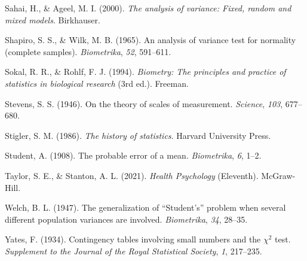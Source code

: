 \documentclass[
  11pt,
  a4paper,
  twoside,symmetric,openright]{book}
\theoremstyle{break}
\theoremstyle{break}
\begin{document}
\begin{CSLReferences}
Sahai, H., \& Ageel, M. I. (2000). \emph{The analysis of variance: Fixed, random and mixed models}. Birkhauser.

Shapiro, S. S., \& Wilk, M. B. (1965). An analysis of variance test for normality (complete samples). \emph{Biometrika}, \emph{52}, 591--611.

Sokal, R. R., \& Rohlf, F. J. (1994). \emph{Biometry: The principles and practice of statistics in biological research} (3rd ed.). Freeman.

Stevens, S. S. (1946). On the theory of scales of measurement. \emph{Science}, \emph{103}, 677--680.

Stigler, S. M. (1986). \emph{The history of statistics}. Harvard University Press.

Student, A. (1908). The probable error of a mean. \emph{Biometrika}, \emph{6}, 1--2.

Taylor, S. E., \& Stanton, A. L. (2021). \emph{Health {Psychology}} (Eleventh). {McGraw-Hill}.

Welch, B. L. (1947). The generalization of {``{S}tudent's''} problem when several different population variances are involved. \emph{Biometrika}, \emph{34}, 28--35.

Yates, F. (1934). Contingency tables involving small numbers and the \(\chi^2\) test. \emph{Supplement to the Journal of the Royal Statistical Society}, \emph{1}, 217--235.

\end{CSLReferences}
\end{document}
